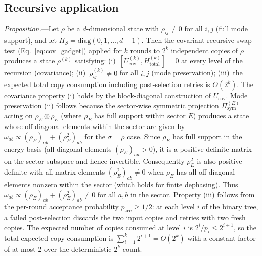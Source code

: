 \documentclass[prx,twocolumn,superscriptaddress,longbibliography,floatfix]{revtex4-2}
\begin{document}
\subsection{Recursive application}
\label{sec:recursive}

\emph{Proposition.}---Let $\rho$ be a $d$-dimensional state with $\rho_{ij} \neq 0$ for all $i,j$ (full mode support), and let $H_S = \mathrm{diag}(0,1,\ldots,d-1)$.
Then the covariant recursive swap test (Eq.~\ref{eq:cov_gadget}) applied for $k$ rounds to $2^k$ independent copies of $\rho$ produces a state $\rho^{(k)}$ satisfying:
(i)~$[U_\mathrm{cov}^{(k)}, H_\mathrm{total}^{(k)}] = 0$ at every level of the recursion (covariance);
(ii)~$\rho^{(k)}_{ij} \neq 0$ for all $i,j$ (mode preservation);
(iii)~the expected total copy consumption including post-selection retries is $O(2^k)$.
The covariance property (i) holds by the block-diagonal construction of $U_\mathrm{cov}$.
Mode preservation (ii) follows because the sector-wise symmetric projection $\Pi_\mathrm{sym}^{(E)}$ acting on $\rho_E \otimes \rho_E$ (where $\rho_E$ has full support within sector $E$) produces a state whose off-diagonal elements within the sector are given by $\omega_{ab} \propto (\rho_E)_{ab} + (\rho_E^2)_{ab}$ for the $\sigma = \rho$ case.
Since $\rho_E$ has full support in the energy basis (all diagonal elements $(\rho_E)_{aa} > 0$), it is a positive definite matrix on the sector subspace and hence invertible.
Consequently $\rho_E^2$ is also positive definite with all matrix elements $(\rho_E^2)_{ab} \neq 0$ when $\rho_E$ has all off-diagonal elements nonzero within the sector (which holds for finite dephasing).
Thus $\omega_{ab} \propto (\rho_E)_{ab} + (\rho_E^2)_{ab} \neq 0$ for all $a, b$ in the sector.
Property (iii) follows from the per-round acceptance probability $p_\mathrm{acc} \geq 1/2$: at each level $i$ of the binary tree, a failed post-selection discards the two input copies and retries with two fresh copies.  The expected number of copies consumed at level $i$ is $2^i / p_i \leq 2^{i+1}$, so the total expected copy consumption is $\sum_{i=1}^{k} 2^{i+1} = O(2^k)$ with a constant factor of at most 2 over the deterministic $2^k$ count.
\end{document}
